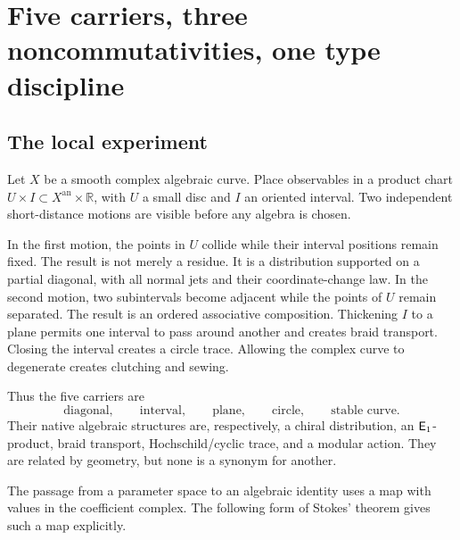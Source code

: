 \chapter{Five carriers, three noncommutativities, one type discipline}

\section{The local experiment}
Let \(X\) be a smooth complex algebraic curve.  Place observables in a product chart \(U\times I\subset X^{\mathrm{an}}\times\mathbb R\), with \(U\) a small disc and \(I\) an oriented interval.  Two independent short-distance motions are visible before any algebra is chosen.

In the first motion, the points in \(U\) collide while their interval positions remain fixed.  The result is not merely a residue.  It is a distribution supported on a partial diagonal, with all normal jets and their coordinate-change law.  In the second motion, two subintervals become adjacent while the points of \(U\) remain separated.  The result is an ordered associative composition.  Thickening \(I\) to a plane permits one interval to pass around another and creates braid transport.  Closing the interval creates a circle trace.  Allowing the complex curve to degenerate creates clutching and sewing.

Thus the five carriers are
\[
 \text{diagonal},\qquad \text{interval},\qquad \text{plane},\qquad
 \text{circle},\qquad \text{stable curve}.
\]
Their native algebraic structures are, respectively, a chiral distribution, an \(\mathsf E_1\)-product, braid transport, Hochschild/cyclic trace, and a modular action.  They are related by geometry, but none is a synonym for another.

The passage from a parameter space to an algebraic identity uses a map
with values in the coefficient complex.
The following form of Stokes' theorem gives such a map explicitly.


